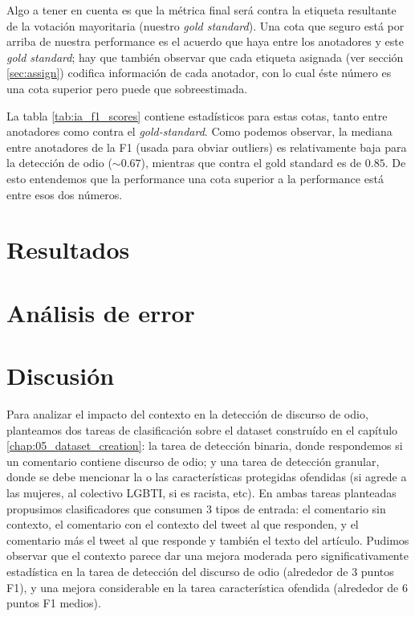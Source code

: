 Algo a tener en cuenta es que la métrica final será contra la etiqueta resultante de la votación mayoritaria (nuestro \emph{gold standard}). Una cota que seguro está por arriba de nuestra performance es el acuerdo que haya entre los anotadores y este \emph{gold standard}; hay que también observar que cada etiqueta asignada (ver sección \ref{sec:assign}) codifica información de cada anotador, con lo cual éste número es una cota superior pero puede que sobreestimada.


La tabla \ref{tab:ia_f1_scores} contiene estadísticos para estas cotas, tanto entre anotadores como contra el \emph{gold-standard}. Como podemos observar, la mediana entre anotadores de la F1 (usada para obviar outliers) es relativamente baja para la detección de odio ($\sim 0.67$), mientras que contra el gold standard es de $0.85$. De esto entendemos que la performance una cota superior a la performance está entre esos dos números.



\section{Resultados}



\section{Análisis de error}





\section{Discusión}

Para analizar el impacto del contexto en la detección de discurso de odio, planteamos dos tareas de clasificación sobre el dataset construído en el capítulo \ref{chap:05_dataset_creation}: la tarea de detección binaria, donde respondemos si un comentario contiene discurso de odio; y una tarea de detección granular, donde se debe mencionar la o las características protegidas ofendidas (si agrede a las mujeres, al colectivo LGBTI, si es racista, etc). En ambas tareas planteadas propusimos clasificadores que consumen 3 tipos de entrada: el comentario sin contexto, el comentario con el contexto del tweet al que responden, y el comentario más el tweet al que responde y también el texto del artículo. Pudimos observar que el contexto parece dar una mejora moderada pero significativamente estadística en la tarea de detección del discurso de odio (alrededor de 3 puntos F1), y una mejora considerable en la tarea característica ofendida (alrededor de 6 puntos F1 medios).

